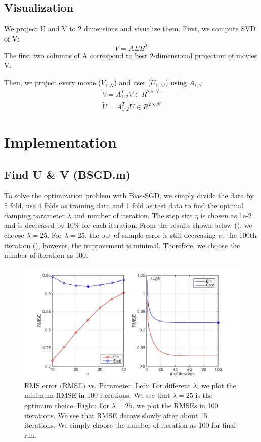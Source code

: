 \documentclass[12pt]{article}
\begin{document}
\subsection{Visualization}
We project U and V to 2 dimensions and visualize them. First, we compute SVD of V:
\begin{equation*}
V=A\Sigma B^{T}
\end{equation*}
The first two columns of A correspond to best 2-dimensional projection of movies V.

Then, we project every movie ($V_{1:N}$) and user ($U_{1:M}$) using $A_{1:2}$:
\begin{eqnarray*}
\tilde{V}=A_{1:2}^{T} V \in R^{2\times N}\\
\tilde{U}=A_{1:2}^{T} U \in R^{2\times N}
\end{eqnarray*}

\section{Implementation}
\subsection{Find U \& V (BSGD.m)}
To solve the optimization problem with Bias-SGD, we simply divide the data by 5 fold, use 4 folds as training data and 1 fold as test data to find the optimal damping parameter $\lambda$  and number of iteration. The step size $\eta$ is chosen as 1e-2 and is decreased by 10\% for each iteration. From the results shown below (), we choose $\lambda=25$. For $\lambda=25$, the out-of-sample error is still decreasing at the 100th iteration (), however, the improvement is minimal. Therefore, we choose the number of iteration as 100.

\begin{figure}[h!]
  \centering
      \includegraphics[width=1.0\textwidth]{testparameter}
  \caption{RMS error (RMSE) vs. Parameter. Left: For different $\lambda$, we plot the minimum RMSE in 100 iterations. We see that $\lambda=25$ is the optimum choice. Right: For $\lambda=25$, we plot the RMSEs in 100 iterations. We see that RMSE decays slowly after about 15 iterations. We simply choose the number of iteration as 100 for final run.}
  \label{fig:test}
\end{figure}
\end{document}
